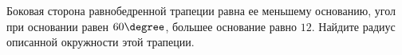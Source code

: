 \begin{ex}
	\begin{condition}
		Боковая сторона равнобедренной трапеции равна ее меньшему основанию, угол при основании равен \( 60\degree\), большее основание равно \( 12 \). Найдите радиус описанной окружности этой трапеции.
	\end{condition}
\end{ex}